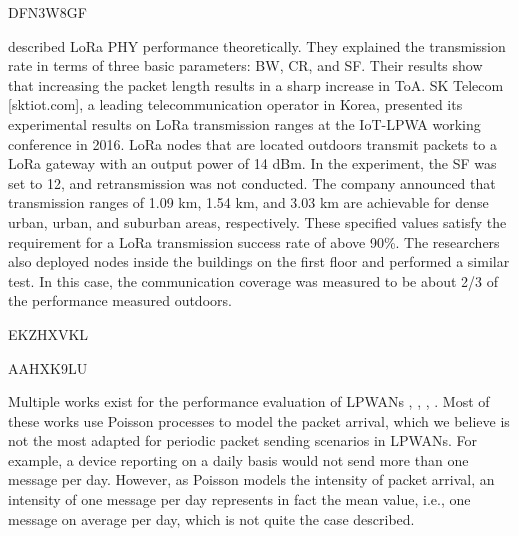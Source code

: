 \cite{kim_experiencing_2019} DFN3W8GF


\citet{noreen_study_2017} described LoRa PHY performance theoretically.
They explained the transmission rate in terms of three basic parameters:
	BW,
	CR,
	and SF.
Their results show that increasing the packet length results in a sharp increase in ToA.
SK Telecom [sktiot.com],
	a leading telecommunication operator in Korea,
	presented its experimental results on LoRa transmission ranges at the IoT-LPWA working conference in 2016.
LoRa nodes that are located outdoors transmit packets to a LoRa gateway with an output power of 14 dBm.
In the experiment,
	the SF was set to 12,
	and retransmission was not conducted.
The company announced that transmission ranges of 1.09 km, 1.54 km,
	and 3.03 km are achievable for dense urban,
	urban,
	and suburban areas,
	respectively.
These specified values satisfy the requirement for a LoRa transmission success rate of above 90\%.
The researchers also deployed nodes inside the buildings on the first floor and performed a similar test.
In this case,
	the communication coverage was measured to be about 2/3 of the performance measured outdoors.








\cite{lavric_performance_2018} EKZHXVKL



\cite{li_2d_2016} AAHXK9LU

Multiple works exist for the performance evaluation of LPWANs \cite{mikhaylov_analysis_2016},
	\cite{goursaud_random_2016},
	\cite{adelantado_understanding_2017},
	\cite{reynders_range_2016}.
Most of these works use Poisson processes to model the packet arrival,
	which we believe is not the most adapted for periodic packet sending scenarios in LPWANs.
For example,
	a device reporting on a daily basis would not send more than one message per day.
However,
	as Poisson models the intensity of packet arrival,
	an intensity of one message per day represents in fact the mean value,
	i.e.,
	one message on average per day,
	which is not quite the case described.


